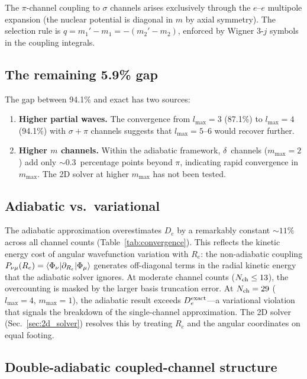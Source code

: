 \documentclass[aps,pra,twocolumn,superscriptaddress,longbibliography]{revtex4-2}
\begin{document}
The $\pi$-channel coupling to $\sigma$ channels arises exclusively
through the $e$--$e$ multipole expansion (the nuclear potential is
diagonal in $m$ by axial symmetry).  The selection rule is
$q = m_1' - m_1 = -(m_2' - m_2)$, enforced by Wigner 3-$j$ symbols
in the coupling integrals.

\subsection{The remaining 5.9\% gap}

The gap between 94.1\% and exact has two sources:
\begin{enumerate}
  \item \textbf{Higher partial waves.}  The convergence from
    $l_{\max}=3$ (87.1\%) to $l_{\max}=4$ (94.1\%) with
    $\sigma{+}\pi$ channels suggests that $l_{\max} = 5$--$6$
    would recover further.
  \item \textbf{Higher $m$ channels.}  Within the adiabatic framework,
    $\delta$~channels ($m_{\max}=2$) add only ${\sim}0.3$~percentage
    points beyond $\pi$, indicating rapid convergence in $m_{\max}$.
    The 2D solver at higher $m_{\max}$ has not been tested.
\end{enumerate}

\subsection{Adiabatic vs.\ variational}

The adiabatic approximation overestimates $D_e$ by a remarkably
constant ${\sim}11\%$ across all channel counts
(Table~\ref{tab:convergence}).  This reflects the kinetic energy cost
of angular wavefunction variation with $R_e$: the non-adiabatic
coupling $P_{\nu\mu}(R_e) =
\braket{\Phi_\nu|\partial_{R_e}|\Phi_\mu}$ generates off-diagonal
terms in the radial kinetic energy that the adiabatic solver ignores.
At moderate channel counts ($N_{\rm ch} \le 13$), the overcounting is
masked by the larger basis truncation error.  At $N_{\rm ch} = 29$
($l_{\max}=4$, $m_{\max}=1$), the adiabatic result exceeds
$D_e^{\rm exact}$---a variational violation that signals the
breakdown of the single-channel approximation.
The 2D solver (Sec.~\ref{sec:2d_solver}) resolves this by treating
$R_e$ and the angular coordinates on equal footing.

\subsection{Double-adiabatic coupled-channel structure}
\end{document}
